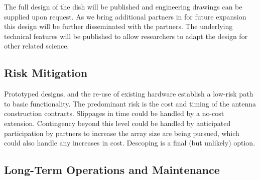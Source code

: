 \documentclass[preprint]{aastex}
\begin{document}
The full design of the dish will be published and engineering drawings can be
supplied upon request.  As we bring additional partners in for future expansion
this design will be further disseminated with the partners.  The underlying
technical features will be published to allow researchers to adapt the design
for other related science.

\vspace{-0.25in}
\subsection{Risk Mitigation}
\vspace{-6pt}


Prototyped designs, and the re-use of existing hardware establish a low-risk path to
basic functionality. The predominant risk is the cost and timing of the
antenna construction contracts.   Slippages in time could be
handled by a no-cost extension.  Contingency beyond this level could be handled by
anticipated participation by partners to 
increase the array size are being pursued, which could also handle any increases in cost.
Descoping is a final (but unlikely) option.

\vspace{-0.25in}
\subsection{Long-Term Operations and Maintenance}
\vspace{-6pt}

\end{document}
